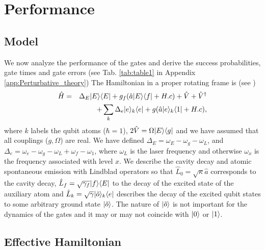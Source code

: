\section{Performance}

\subsection{Model}
We now analyze the performance of the gates and derive the success
probabilities, gate times and gate errors (see Tab. \ref{tab:table1} in Appendix
\ref{app:Perturbative_theory}) The Hamiltonian in a proper rotating frame is (see
)
\begin{eqnarray} 
\hat{H}&=&
\Delta_{E}| E \rangle
\langle E |+g_{f}(\hat{a}| E \rangle\langle f |+H.c)+\hat{V}+\hat{V}^{\dagger} \nonumber \\
&&+\sum_{k}\Delta_{e}| e \rangle_{k}\langle e |+g(\hat{a}| e \rangle_{k}\langle 1 |+H.c),
\end{eqnarray}          
where $k$ labels the qubit atoms ($\hbar=1$), $2\hat{V}=\Omega| E \rangle\langle g |$
and we have assumed that all couplings ($g,\Omega$) are real. We have defined
$\Delta_{E}=\omega_{E}-\omega_{g}-\omega_{L}$, and
$\Delta_{e}=\omega_{e}-\omega_{g}-\omega_{L}+\omega_{f}-\omega_{1}$, where
$\omega_{L}$ is the laser frequency and otherwise $\omega_{x}$ is the frequency
associated with level $x$. We describe the cavity decay and atomic spontaneous
emission with Lindblad operators so that $\hat{L}_{0}=\sqrt{\kappa}\hat{a}$
corresponds to the cavity decay,  $\hat{L}_{f}=\sqrt{\gamma_{f}}| f \rangle\langle E |$
to the decay of the excited state of the auxiliary atom and
$\hat{L}_{k}=\sqrt{\gamma}| \tilde{o} \rangle_{k}\langle e |$ describes the decay of the
excited qubit states to some arbitrary ground state $| \tilde{o} \rangle$. The
nature of $| \tilde{o} \rangle$ is not important for the dynamics of the gates and
it may or may not coincide with $| 0 \rangle$ or $| 1 \rangle$.

\subsection{Effective Hamiltonian}

